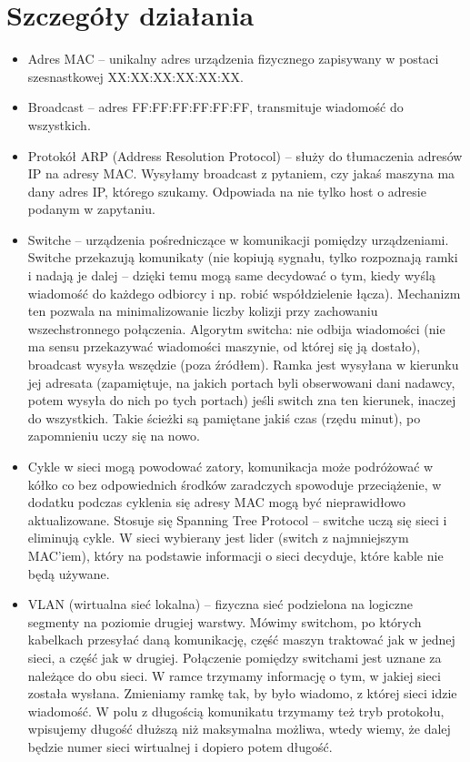\section{Szczegóły działania}
\begin{itemize}
	\item Adres MAC -- unikalny adres urządzenia fizycznego zapisywany w postaci szesnastkowej XX:XX:XX:XX:XX:XX.
	\item Broadcast -- adres FF:FF:FF:FF:FF:FF, transmituje wiadomość do wszystkich.
	\item Protokół ARP (Address Resolution Protocol) -- służy do tłumaczenia adresów IP na adresy MAC. Wysyłamy broadcast z pytaniem, czy jakaś maszyna ma dany adres IP, którego szukamy. Odpowiada na nie tylko host o adresie podanym w zapytaniu.
	\item Switche -- urządzenia pośredniczące w komunikacji pomiędzy urządzeniami. Switche przekazują komunikaty (nie kopiują sygnału, tylko rozpoznają ramki i nadają je dalej -- dzięki temu mogą same decydować o tym, kiedy wyślą wiadomość do każdego odbiorcy i np. robić współdzielenie łącza). Mechanizm ten pozwala na minimalizowanie liczby kolizji przy zachowaniu wszechstronnego połączenia. Algorytm switcha: nie odbija wiadomości (nie ma sensu przekazywać wiadomości maszynie, od której się ją dostało), broadcast wysyła wszędzie (poza źródłem). Ramka jest wysyłana w kierunku jej adresata (zapamiętuje, na jakich portach byli obserwowani dani nadawcy, potem wysyła do nich po tych portach) jeśli switch zna ten kierunek, inaczej do wszystkich. Takie ścieżki są pamiętane jakiś czas (rzędu minut), po zapomnieniu uczy się na nowo.
	\item Cykle w sieci mogą powodować zatory, komunikacja może podróżować w kółko co bez odpowiednich środków zaradczych spowoduje przeciążenie, w dodatku podczas cyklenia się adresy MAC mogą być nieprawidłowo aktualizowane. Stosuje się Spanning Tree Protocol -- switche uczą się sieci i eliminują cykle. W sieci wybierany jest lider (switch z najmniejszym MAC'iem), który na podstawie informacji o sieci decyduje, które kable nie będą używane.
	\item VLAN (wirtualna sieć lokalna) -- fizyczna sieć podzielona na logiczne segmenty na poziomie drugiej warstwy. Mówimy switchom, po których kabelkach przesyłać daną komunikację, część maszyn traktować jak w jednej sieci, a część jak w drugiej. Połączenie pomiędzy switchami jest uznane za należące do obu sieci. W ramce trzymamy informację o tym, w jakiej sieci została wysłana. Zmieniamy ramkę tak, by było wiadomo, z której sieci idzie wiadomość. W polu z długością komunikatu trzymamy też tryb protokołu, wpisujemy długość dłuższą niż maksymalna możliwa, wtedy wiemy, że dalej będzie numer sieci wirtualnej i dopiero potem długość.
\end{itemize}
